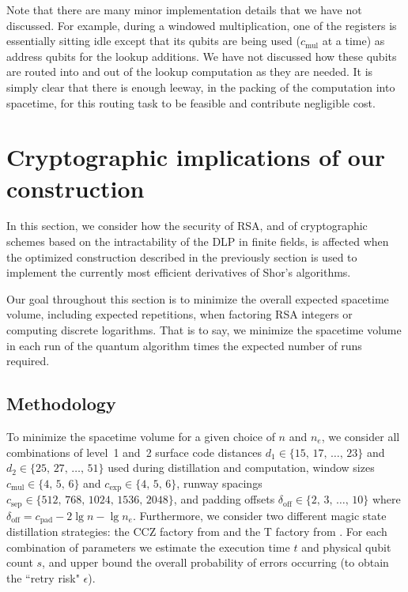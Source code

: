 \documentclass[superscriptaddress,notitlepage,longbibliography]{revtex4-1}
\theoremstyle{definition}
\theoremstyle{definition}
\newcommand{\lenexp}{{n_e}}
\newcommand{\devoff}{{\delta_{\text{off}}}}
\newcommand{\gexp}{{c_{\text{exp}}}}
\newcommand{\gmul}{{c_{\text{mul}}}}
\newcommand{\gsep}{{c_{\text{sep}}}}
\newcommand{\gpad}{{c_{\text{pad}}}}
\newcommand{\distone}{{d_1}}
\newcommand{\disttwo}{{d_2}}
\begin{document}
Note that there are many minor implementation details that we have not discussed.
For example, during a windowed multiplication, one of the registers is essentially sitting idle except that its qubits are being used ($\gmul$ at a time) as address qubits for the lookup additions.
We have not discussed how these qubits are routed into and out of the lookup computation as they are needed.
It is simply clear that there is enough leeway, in the packing of the computation into spacetime, for this routing task to be feasible and contribute negligible cost.















\section{Cryptographic implications of our construction}
\label{sec:impact}
In this section, we consider how the security of RSA, and of cryptographic schemes based on the intractability of the DLP in finite fields, is affected when the optimized construction described in the previously section is used to implement the currently most efficient derivatives of Shor's algorithms.

Our goal throughout this section is to minimize the overall expected spacetime volume, including expected repetitions, when factoring RSA integers or computing discrete logarithms. That is to say, we minimize the spacetime volume in each run of the quantum algorithm times the expected number of runs required.

\subsection{Methodology}
\label{sec:methodology}
To minimize the spacetime volume for a given choice of $n$ and $\lenexp$, we consider all combinations of
  level~1 and~2 surface code distances $\distone \in \{ 15, \, 17, \, \dots, \, 23 \}$ and $\disttwo \in \{ 25, \, 27, \, \dots, \, 51 \}$ used during distillation and computation,
  window sizes $\gmul \in \{ 4, \, 5, \, 6 \}$ and $\gexp \in \{ 4, \, 5, \, 6 \}$,
  runway spacings $\gsep \in \{ 512, \, 768, \, 1024, \, 1536, \, 2048 \}$,
  and padding offsets $\devoff \in \{ 2, \, 3, \, \dots, \, 10 \}$ where $\devoff = \gpad - 2 \lg n - \lg \lenexp$.
Furthermore, we consider two different magic state distillation strategies: the CCZ factory from \cite{gidney2018magic, gidney2019autoccz} and the T factory from \cite{fowler2018}.
For each combination of parameters we estimate the execution time $t$ and physical qubit count $s$, and upper bound the overall probability of errors occurring (to obtain the ``retry risk" $\epsilon$).
\end{document}
